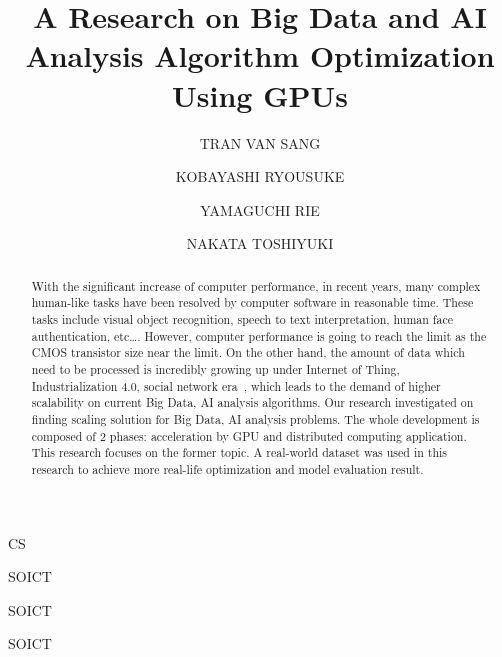 \documentclass[English]{dicomopapers}
\begin{document}
\title{A Research on Big Data and AI Analysis Algorithm Optimization Using GPUs}


\author{TRAN VAN SANG}{CS}
\author{KOBAYASHI RYOUSUKE}{SOICT}
\author{YAMAGUCHI RIE}{SOICT}
\author{NAKATA TOSHIYUKI}{SOICT}

\begin{abstract}
With the significant increase of computer performance, in recent years, many complex human-like tasks have been resolved by computer software in reasonable time. These tasks include visual object recognition, speech to text interpretation, human face authentication, etc\ldots. However, computer performance is going to reach the limit as the CMOS transistor size near the limit. On the other hand, the amount of data which need to be processed is incredibly growing up under Internet of Thing, Industrialization 4.0, social network era~\cite{lohr2012age}, which leads to the demand of higher scalability on current Big Data, AI analysis algorithms. Our research investigated on finding scaling solution for Big Data, AI analysis problems. The whole development is composed of 2 phases: acceleration by GPU and distributed computing application. This research focuses on the former topic. A real-world dataset was used in this research to achieve more real-life optimization and model evaluation result.
\end{abstract}

\maketitle

\end{document}
